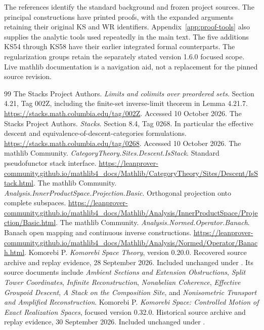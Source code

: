 \clearpage
{}\label{app:references}
The references identify the standard background and frozen project sources. The principal constructions have printed proofs, with the expanded arguments retaining their original KS and WR identifiers. Appendix~\ref{app:proof-tools} also supplies the analytic tools used repeatedly in the main text. The five additions KS54 through KS58 have their earlier integrated formal counterparts. The regularization groups retain the separately stated version 1.6.0 focused scope. Live mathlib documentation is a navigation aid, not a replacement for the pinned source revision.

\begin{thebibliography}{99}
 The Stacks Project Authors. \emph{Limits and colimits over preordered sets}. Section 4.21, Tag 002Z, including the finite-set inverse-limit theorem in Lemma 4.21.7. \url{https://stacks.math.columbia.edu/tag/002Z}. Accessed 10 October 2026.
 The Stacks Project Authors. \emph{Stacks}. Section 8.4, Tag 0268. In particular the effective descent and equivalence-of-descent-categories formulations. \url{https://stacks.math.columbia.edu/tag/0268}. Accessed 10 October 2026.
 The mathlib Community. \emph{CategoryTheory.Sites.Descent.IsStack}. Standard pseudofunctor stack interface. \url{https://leanprover-community.github.io/mathlib4_docs/Mathlib/CategoryTheory/Sites/Descent/IsStack.html}.
 The mathlib Community. \emph{Analysis.InnerProductSpace.Projection.Basic}. Orthogonal projection onto complete subspaces. \url{https://leanprover-community.github.io/mathlib4_docs/Mathlib/Analysis/InnerProductSpace/Projection/Basic.html}.
 The mathlib Community. \emph{Analysis.Normed.Operator.Banach}. Banach open mapping and continuous inverse constructions. \url{https://leanprover-community.github.io/mathlib4_docs/Mathlib/Analysis/Normed/Operator/Banach.html}.
 Komorebi P. \emph{Komorebi Space Theory}, version 0.20.0. Recovered source archive and replay evidence, 28 September 2026. Included unchanged under . Its source documents include \emph{Ambient Sections and Extension Obstructions}, \emph{Split Tower Coordinates}, \emph{Infinite Reconstruction}, \emph{Nonabelian Coherence}, \emph{Effective Groupoid Descent}, \emph{A Stack on the Composition Site}, and \emph{Nonisometric Transport and Amplified Reconstruction}.
 Komorebi P. \emph{Komorebi Space: Controlled Motion of Exact Realization Spaces}, focused version 0.32.0. Historical source archive and replay evidence, 30 September 2026. Included unchanged under .

\end{thebibliography}
